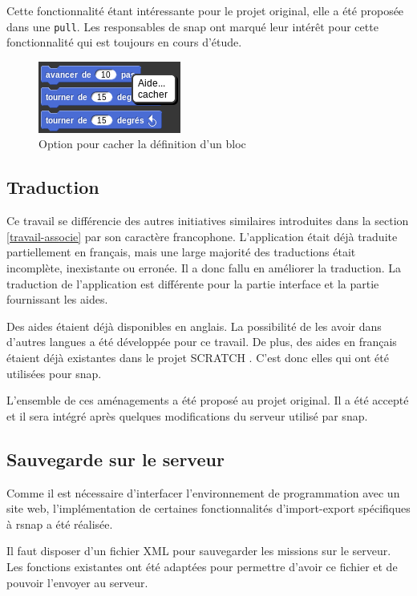 Cette fonctionnalité étant intéressante pour le projet original, elle a été proposée dans une \texttt{\gls{pull}}. Les responsables de \gls{snap} ont marqué leur intérêt pour cette fonctionnalité qui est toujours en cours d'étude.
\begin{figure}
  \begin{center}
    \includegraphics[scale=0.5]{content/7-solution/2-snap/images/cacher}
    \caption{Option pour cacher la définition d'un bloc}
    \label{fig:cacher}
  \end{center}
\end{figure}

\subsection{Traduction}
Ce travail se différencie des autres initiatives similaires introduites dans la section \ref{travail-associe} par son caractère francophone. L'application était déjà traduite partiellement en français, mais une large majorité des traductions était incomplète, inexistante ou erronée. Il a donc fallu en améliorer la traduction. La traduction de l'application est différente pour la partie interface et la partie fournissant les aides.

Des aides étaient déjà disponibles en anglais. La possibilité de les avoir dans d'autres langues a été développée pour ce travail. De plus, des aides en français étaient déjà existantes dans le projet SCRATCH \cite{scratch-translation}. C'est donc elles qui ont été utilisées pour \gls{snap}.

L'ensemble de ces aménagements a été proposé au projet original. Il a été accepté et il sera intégré après quelques modifications du serveur utilisé par \gls{snap}.

\subsection{Sauvegarde sur le serveur}
Comme il est nécessaire d'interfacer l'environnement de programmation avec un site web, l'implémentation de certaines fonctionnalités d'import-export spécifiques à \gls{rsnap} a été réalisée.

Il faut disposer d'un fichier XML pour sauvegarder les \glspl{mission} sur le serveur. Les fonctions existantes ont été adaptées pour permettre d'avoir ce fichier et de pouvoir l'envoyer au serveur.
